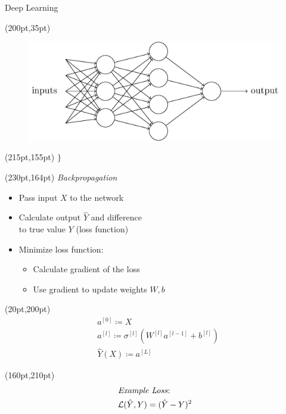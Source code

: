 \documentclass[10pt]{beamer}
\begin{document}
\begin{frame}{Deep Learning}
  \begin{textblock*}{150pt}(200pt,35pt)
    \begin{figure}[htp]
      \includegraphics[width=\textwidth]{../images/tikz1.png}
    \end{figure}
  \end{textblock*}
  \begin{textblock*}{150pt}(215pt,155pt)
    \Huge{$\}$}
  \end{textblock*}
  \begin{textblock*}{150pt}(230pt,164pt)
    \emph{Backpropagation}
  \end{textblock*}
  \begin{itemize}
  \item Pass input $X$ to the network
  \item Calculate output $\hat{Y}$ and difference\\ to true value $Y$ (loss function)
  \item Minimize loss function:
    \begin{itemize}
    \item Calculate gradient of the loss
    \item Use gradient to update weights $W, b$
    \end{itemize}
  \end{itemize}
  \begin{textblock*}{150pt}(20pt,200pt)
    \begin{align*}
      &a^{[0]} \coloneqq X \\
      &a^{[l]} \coloneqq \sigma^{[l]}(W^{[l]} a^{[l-1]}+ b^{[l]})\\
      &\hat{Y}(X) \coloneqq a^{[L]}
    \end{align*}
  \end{textblock*}

  \begin{textblock*}{170pt}(160pt,210pt)
    \begin{align*}
      &\text{\emph{Example Loss}:}\\
      &\mathcal{L}(\hat{Y}, Y) = (\hat{Y} - Y)^2
    \end{align*}
  \end{textblock*}
\end{frame}
\end{document}
